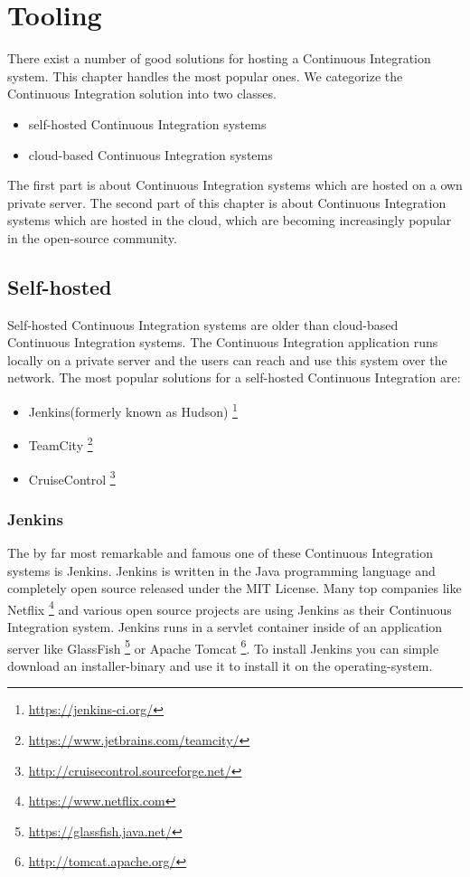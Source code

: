 \section{Tooling}\label{sec:tooling}

There exist a number of good solutions for hosting a Continuous Integration
system. This chapter handles the most popular ones. We categorize the
Continuous Integration solution into two classes. 

\begin{itemize} 
    \item self-hosted Continuous Integration systems
    \item cloud-based Continuous Integration systems 
\end{itemize}

The first part is about Continuous Integration systems which are hosted on a
own private server. The second part of this chapter is about Continuous
Integration systems which are hosted in the cloud, which are becoming
increasingly popular in the open-source community.

\subsection{Self-hosted}\label{sec:tooling-self-hosted}

Self-hosted Continuous Integration systems are older than cloud-based Continuous
Integration systems. The Continuous Integration application runs locally on a
private server and the users can reach and use this system over the network. The
most popular solutions for a self-hosted Continuous Integration are:

\begin{itemize} 
    \item Jenkins(formerly known as Hudson)
        \footnote{\url{https://jenkins-ci.org/}}
    \item TeamCity \footnote{\url{https://www.jetbrains.com/teamcity/}}
    \item CruiseControl \footnote{\url{http://cruisecontrol.sourceforge.net/}}
\end{itemize}

\subsubsection{Jenkins}

The by far most remarkable and famous one of these Continuous Integration
systems is Jenkins. Jenkins is written in the Java programming language and
completely open source released under the MIT License. Many top companies like
Netflix \footnote{\url{https://www.netflix.com}} and various open source
projects are using Jenkins as their Continuous Integration system. Jenkins runs
in a servlet container inside of an application server like GlassFish
\footnote{\url{https://glassfish.java.net/}} or Apache Tomcat
\footnote{\url{http://tomcat.apache.org/}}. To install Jenkins you can simple
download an installer-binary and use it to install it on the operating-system.\\

